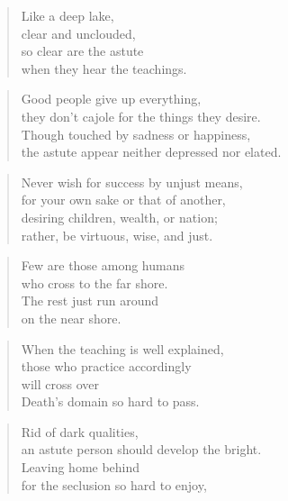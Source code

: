 \documentclass[12pt,openany]{book}%
\begin{document}
\begin{verse}%
Like a deep lake, \\
clear and unclouded, \\
so clear are the astute \\
when they hear the teachings. 

%
\end{verse}

\begin{verse}%
Good people give up everything, \\
they don’t cajole for the things they desire. \\
Though touched by sadness or happiness, \\
the astute appear neither depressed nor elated. 

%
\end{verse}

\begin{verse}%
Never wish for success by unjust means, \\
for your own sake or that of another, \\
desiring children, wealth, or nation; \\
rather, be virtuous, wise, and just. 

%
\end{verse}

\begin{verse}%
Few are those among humans \\
who cross to the far shore. \\
The rest just run around \\
on the near shore. 

%
\end{verse}

\begin{verse}%
When the teaching is well explained, \\
those who practice accordingly \\
will cross over \\
Death’s domain so hard to pass. 

%
\end{verse}

\begin{verse}%
Rid of dark qualities, \\
an astute person should develop the bright. \\
Leaving home behind \\
for the seclusion so hard to enjoy, 

%
\end{verse}
\end{document}
